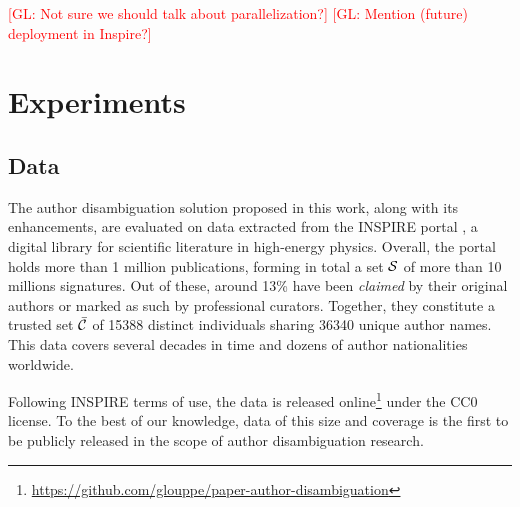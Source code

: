 \documentclass{article}
\newcommand{\glnote}[1]{\textcolor{red}{[GL: #1]}}
\begin{document}
\glnote{Not sure we should talk about parallelization?}
\glnote{Mention (future) deployment in Inspire?}




\section{Experiments}
\label{experiments}

\subsection{Data}

The author disambiguation solution proposed in this work, along with its
enhancements, are evaluated on data extracted from the INSPIRE portal
\citep{gentil2009information}, a digital library for scientific literature in
high-energy physics. Overall, the portal holds more than 1 million
publications, forming in total a set ${\cal S}$ of more than 10 millions
signatures. Out of these, around 13\% have been \textit{claimed} by their
original authors or marked as such by professional curators. Together, they
constitute a trusted set $\bar{\cal C}$ of 15388 distinct individuals sharing
36340 unique author names. This data covers  several decades in time and dozens of
author nationalities worldwide.

Following INSPIRE terms of use, the data is released
online\footnote{\url{https://github.com/glouppe/paper-author-disambiguation}}
under the CC0 license. To the best of our knowledge, data of this size and
coverage is the first to be publicly released in the scope of author
disambiguation research.

\end{document}
